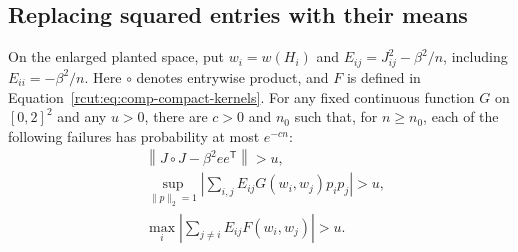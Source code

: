 \subsection{Replacing squared entries with their means}

\begin{lemma}
 \label{rcut:lem:comp-square-replacement}
 On the enlarged planted space, put $w_i=w(H_i)$ and
 $E_{ij}=J_{ij}^2-\beta^2/n$, including $E_{ii}=-\beta^2/n$.
 Here $\circ$ denotes entrywise product, and $F$ is defined in
 Equation~\eqref{rcut:eq:comp-compact-kernels}.
 For any fixed continuous function $G$ on $[0,2]^2$ and any $u>0$,
 there are $c>0$ and $n_0$ such that, for $n\ge n_0$, each of the
 following failures has probability at most $e^{-cn}$:
 \begin{align}
  &\left\|J\circ J-\beta^2ee^{\mathsf T}\right\|>u,
    \label{rcut:eq:comp-square-operator}\\
  &\sup_{\|p\|_2=1}
     \left|\sum_{i,j}E_{ij}G(w_i,w_j)p_ip_j\right|>u,
    \label{rcut:eq:comp-weighted-operator}\\
  &\max_i\left|\sum_{j\ne i}
       E_{ij}F(w_i,w_j)\right|>u.
    \label{rcut:eq:comp-weighted-diagonal}
 \end{align}
\end{lemma}

